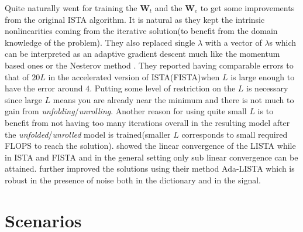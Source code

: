 Quite naturally \cite{Gregor2010} went for training the $\boldsymbol{W}_t$ and the $\boldsymbol{W}_e$ to get some improvements 
from the original \ac{ISTA}\cite{Daubechies2003} algorithm. It is natural as they kept the intrinsic 
nonlinearities coming from the iterative solution(to benefit from the domain knowledge of the problem). 
They also replaced single $\lambda$ with a vector of $\lambda$s which can be interpreted as an adaptive gradient descent 
much like the momentum based ones \cite{Boyd2004}\cite{Nocedal2006} or the Nesterov method \cite{Nesterov2004}\cite{Nesterov2018}. 
They reported having comparable errors to that of $20L$ in the accelerated  version of 
\ac{ISTA}\cite{Daubechies2003}(\ac{FISTA}\cite{Beck2009})when $L$ is large enough to have the error around $4$. 
Putting some level of restriction on the $L$ is necessary since large $L$ means you are already near the minimum 
and there is not much to gain from \emph{unfolding}/\emph{unrolling}. Another reason for using quite small $L$ is to benefit 
from not having too many iterations overall in the resulting model after the \emph{unfolded}/\emph{unrolled} model is 
trained(smaller $L$ corresponds to small required \ac{FLOPS}\cite{Hager2010}\cite{Hennessy2019} to reach the solution). 
\cite{Chen2018} showed the linear convergence of the \ac{LISTA} while in \ac{ISTA} and \ac{FISTA} and in the general setting only sub linear convergence can be attained\cite{Daubechies2003}\cite{Beck2009}. 
\cite{Aberdam2020} further improved the solutions using their method \ac{Ada-LISTA} which is robust in the presence of noise both in the dictionary and in the signal.


\section{Scenarios}

